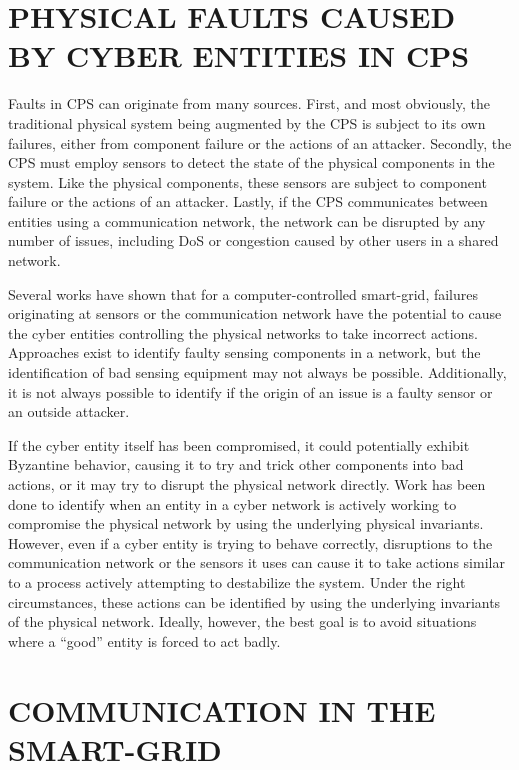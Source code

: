 \section{PHYSICAL FAULTS CAUSED BY CYBER ENTITIES IN CPS}

Faults in \ac{CPS} can originate from many sources.
First, and most obviously, the traditional physical system being augmented by the CPS is subject to its own failures, either from component failure or the actions of an attacker.
Secondly, the \ac{CPS} must employ sensors to detect the state of the physical components in the system.
Like the physical components, these sensors are subject to component failure or the actions of an attacker.
Lastly, if the \ac{CPS} communicates between entities using a communication network, the network can be disrupted by any number of issues, including DoS or congestion caused by other users in a shared network.

Several works have shown\cite{Roth2012}\cite{HARINI}\cite{CYBERRESEARCHCALL} that for a computer-controlled smart-grid, failures originating at sensors or the communication network have the potential to cause the cyber entities controlling the physical networks to take incorrect actions.
Approaches exist to identify faulty sensing components in a network, but the identification of bad sensing equipment may not always be possible.
Additionally, it is not always possible to identify if the origin of an issue is a faulty sensor or an outside attacker.

If the cyber entity itself has been compromised, it could potentially exhibit Byzantine behavior, causing it to try and trick other components into bad actions\cite{Roth2012}, or it may try to disrupt the physical network directly.
Work has been done to identify when an entity in a cyber network is actively working to compromise the physical network by using the underlying physical invariants.
However, even if a cyber entity is trying to behave correctly, disruptions to the communication network or the sensors it uses can cause it to take actions similar to a process actively attempting to destabilize the system.
Under the right circumstances, these actions can be identified by using the underlying invariants of the physical network.
Ideally, however, the best goal is to avoid situations where a ``good'' entity is forced to act badly.

\section{COMMUNICATION IN THE SMART-GRID}

